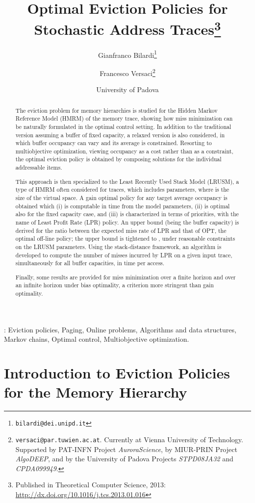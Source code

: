 \documentclass[11pt,a4paper]{article}
\title{Optimal Eviction Policies for Stochastic Address
  Traces\footnote{Published in Theoretical Computer Science, 2013:
    \url{http://dx.doi.org/10.1016/j.tcs.2013.01.016}}}
\author{Gianfranco Bilardi\thanks{\texttt{bilardi@dei.unipd.it}} \and Francesco
  Versaci\thanks{\texttt{versaci@par.tuwien.ac.at}. {Currently at Vienna
      University of Technology. Supported by PAT-INFN Project
      \emph{AuroraScience}, by MIUR-PRIN Project \emph{AlgoDEEP}, and by the
      University of Padova Projects \emph{STPD08JA32} and \emph{CPDA099949}.}}}
\date{University of Padova}
\theoremstyle{definition}
\theoremstyle{remark}
\begin{document}
\maketitle

\begin{abstract}
  The eviction problem for memory hierarchies is studied for the
  Hidden Markov Reference Model (HMRM) of the memory trace,
  showing how miss minimization can be naturally formulated in
  the optimal control setting.
    In addition to the traditional version assuming a buffer of fixed
  capacity, a relaxed version is also considered, in which buffer
  occupancy can vary and its average is constrained.
    Resorting to multiobjective optimization, viewing occupancy as a
  cost rather than as a constraint, the optimal eviction policy is
  obtained by composing solutions for the individual addressable
  items.

  This approach is then specialized to the Least Recently Used Stack Model
  (LRUSM), a type of HMRM often considered for traces, which includes 
  parameters, where  is the size of the virtual space. A gain optimal policy
  for any target average occupancy is obtained which (i) is computable in time
   from the model parameters, (ii) is optimal also for the fixed capacity
  case, and (iii) is characterized in terms of priorities, with the name of
  Least Profit Rate (LPR) policy. An  upper bound (being  the
  buffer capacity) is derived for the ratio between the expected miss rate of
  LPR and that of OPT, the optimal off-line policy; the upper bound is tightened
  to , under reasonable constraints on the LRUSM parameters. Using the
  stack-distance framework, an algorithm is developed to compute the number of
  misses incurred by LPR on a given input trace, simultaneously for all buffer
  capacities, in time  per access.

  Finally, some results are provided for miss minimization over a
  finite horizon and over an infinite horizon under bias optimality,
  a criterion more stringent than gain optimality.

\end{abstract}

\vspace{5mm}
: Eviction policies, Paging, Online problems,
Algorithms and data structures, Markov chains, Optimal control,
Multiobjective optimization.
 





\section{Introduction to Eviction Policies for the Memory Hierarchy}
\label{chap:an-optimal-control}
\end{document}
